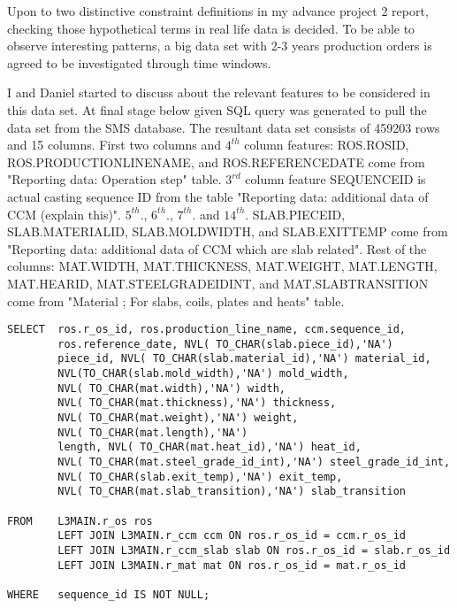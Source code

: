 \documentclass{article}
\begin{document}
Upon to two distinctive constraint definitions in my advance project 2 report, checking those hypothetical terms in real life data is decided. To be able to observe interesting patterns, a big data set with 2-3 years production orders is agreed to be investigated through time windows. 

I and Daniel started to discuss about the relevant features to be considered in this data set. At final stage below given SQL query was generated to pull the data set from the SMS database. The resultant data set consists of 459203 rows and 15 columns. First two columns and $4^{th}$ column features: ROS.R\textunderscore OS\textunderscore ID, ROS.PRODUCTION\textunderscore LINE\textunderscore NAME, and ROS.REFERENCE\textunderscore DATE come from "Reporting data: Operation step" table. $3^{rd}$ column feature SEQUENCE\textunderscore ID is actual casting sequence ID from the table "Reporting data: additional data of CCM (explain this)". $5^{th}$., $6^{th}$., $7^{th}$. and $14^{th}$. SLAB.PIECE\textunderscore ID, SLAB.MATERIAL\textunderscore ID, SLAB.MOLD\textunderscore WIDTH, and SLAB.EXIT\textunderscore TEMP come from "Reporting data: additional data of CCM which are slab related". Rest of the columns: MAT.WIDTH, MAT.THICKNESS, MAT.WEIGHT, MAT.LENGTH, MAT.HEAR\textunderscore ID, MAT.STEEL\textunderscore GRADE\textunderscore ID\textunderscore INT, and MAT.SLAB\textunderscore TRANSITION come from "Material ;  For slabs, coils, plates and heats" table.

\begin{lstlisting}
SELECT  ros.r_os_id, ros.production_line_name, ccm.sequence_id,        
        ros.reference_date, NVL( TO_CHAR(slab.piece_id),'NA') 
        piece_id, NVL( TO_CHAR(slab.material_id),'NA') material_id, 
        NVL(TO_CHAR(slab.mold_width),'NA') mold_width, 
        NVL( TO_CHAR(mat.width),'NA') width, 
        NVL( TO_CHAR(mat.thickness),'NA') thickness, 
        NVL( TO_CHAR(mat.weight),'NA') weight, 
        NVL( TO_CHAR(mat.length),'NA')
        length, NVL( TO_CHAR(mat.heat_id),'NA') heat_id, 
        NVL( TO_CHAR(mat.steel_grade_id_int),'NA') steel_grade_id_int, 
        NVL( TO_CHAR(slab.exit_temp),'NA') exit_temp, 
        NVL( TO_CHAR(mat.slab_transition),'NA') slab_transition

FROM   	L3MAIN.r_os ros 
        LEFT JOIN L3MAIN.r_ccm ccm ON ros.r_os_id = ccm.r_os_id 
        LEFT JOIN L3MAIN.r_ccm_slab slab ON ros.r_os_id = slab.r_os_id 
        LEFT JOIN L3MAIN.r_mat mat ON ros.r_os_id = mat.r_os_id 

WHERE  	sequence_id IS NOT NULL;
\end{lstlisting}
\end{document}
